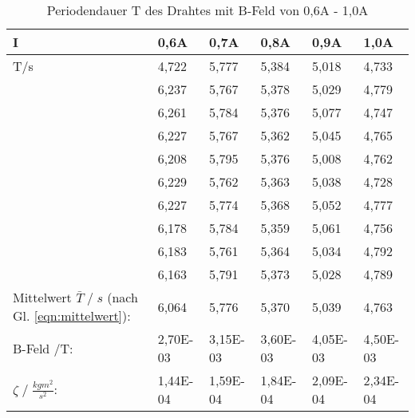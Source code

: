 \begin{table}[h!]
    \centering
    \caption{Periodendauer T des Drahtes mit B-Feld von 0,6A - 1,0A}
    \begin{tabular}{p{3cm} | p{1.5cm} p{1.5cm} p{1.5cm} p{1.5cm} p{1.5cm}}
    I & 0,6A & 0,7A & 0,8A & 0,9A & 1,0A\\
    \midrule
    T\;/\;s  & 4,722 &  5,777 &  5,384 &  5,018 &  4,733\\
    & 6,237 &  5,767 &  5,378 &  5,029 &  4,779\\
    & 6,261 &  5,784 &  5,376 &  5,077 &  4,747\\
    & 6,227 &  5,767 &  5,362 &  5,045 &  4,765\\
    & 6,208 &  5,795 &  5,376 &  5,008 &  4,762\\
    & 6,229 &  5,762 &  5,363 &  5,038 &  4,728\\
    & 6,227 &  5,774 &  5,368 &  5,052 &  4,777\\
    & 6,178 &  5,784 &  5,359 &  5,061 &  4,756\\
    & 6,183 &  5,761 &  5,364 &  5,034 &  4,792\\
    & 6,163 &  5,791 &  5,373 &  5,028 &  4,789\\
    \midrule
    Mittelwert $\bar{T}\;/\;s$ (nach Gl. \ref{eqn:mittelwert}):    & 6,064 & 5,776 & 5,370 & 5,039 &  4,763 \\
    \midrule
    B-Feld \;/\;T: & 2,70E-03 & 3,15E-03 & 3,60E-03 & 4,05E-03 & 4,50E-03 \\      
    $\zeta\;/\;\frac{kgm^2}{s^2}$: & 1,44E-04 & 1,59E-04 & 1,84E-04 & 2,09E-04 & 2,34E-04\\
    \bottomrule
    \end{tabular}
    \label{tab:tabelle_06A}
\end{table}

\label{sec:Auswertung}
